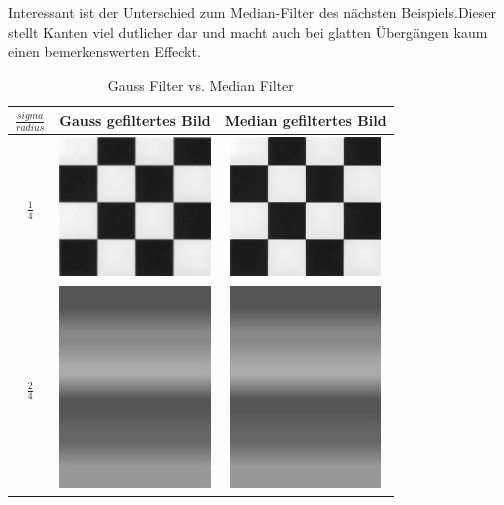 \documentclass[12pt,german]{article}
\begin{document}
Interessant ist der Unterschied zum Median-Filter des nächsten Beispiels.Dieser stellt Kanten viel dutlicher dar und macht auch bei glatten Übergängen kaum einen bemerkenswerten Effeckt.
\begin{table}[H]
  \centering
  \begin{tabular}{| c | c | c |}
    \hline
    $ \frac{sigma}{radius} $ & Gauss gefiltertes Bild & Median gefiltertes Bild \\
    \hline
    $ \frac{1}{4} $ &
	\includegraphics[width=4cm]{../testData/Gauss/SchachbrettR4S2.jpg} & 	\includegraphics[width=4cm]{../testData/Median/SchachbrettR4.jpg} \\
	    \hline
    $ \frac{2}{4} $ &
	\includegraphics[width=4cm]{../testData/Gauss/RegenbogenR4S2.jpg} & 	\includegraphics[width=4cm]{../testData/Median/RegenbogenR4.jpg} \\
  \end{tabular}
  \caption{Gauss Filter vs. Median Filter}
  \label{tab:GaussMedianFilterEvaluierung}
\end{table}
\end{document}
